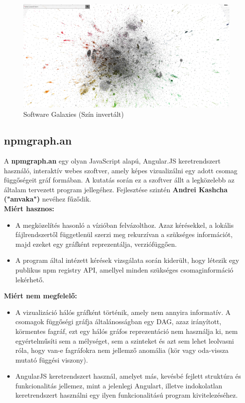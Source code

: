 	\begin{flushright}
		\cite{anvaka-galaxies}
	\end{flushright}
	
	\begin{figure}[!h]
		\centering
		\includegraphics[scale=0.1]{images/anvaka_pm.png}
		\caption{Software Galaxies (Szín invertált)}
		\label{fig:sw-galaxies}
	\end{figure}
	
	\subsection{npmgraph.an}
	
	A \textbf{npmgraph.an} egy olyan JavaScript alapú, Angular.JS keretrendszert használó, interaktív webes szoftver, amely képes vizualizálni egy adott csomag függőségeit gráf formában. A kutatás során ez a szoftver állt a legközelebb az általam tervezett program jellegéhez.	Fejlesztése szintén \textbf{Andrei Kashcha ("anvaka")} nevéhez fűződik.	\\
	
	\textbf{Miért hasznos:}
	\begin{itemize}
		\item A megközelítés hasonló a vízióban felvázolthoz. Azaz kérésekkel, a lokális fájlrendszertől függetlenül szerzi meg rekurzívan a szükséges információt, majd ezeket egy gráfként reprezentálja, verziófüggően.
		\item A program által intézett kérések vizsgálata során kiderült, hogy létezik egy publikus npm registry API, amellyel minden szükséges csomaginformáció lekérhető.
	\end{itemize}
	
	\textbf{Miért nem megfelelő:}
	\begin{itemize}
		\item A vizualizáció hálós gráfként történik, amely nem annyira informatív. A csomagok függőségi gráfja általánosságban egy DAG, azaz irányított, körmentes fagráf, ezt egy hálós gráfos reprezentáció nem használja ki, nem egyértelműsíti sem a mélységet, sem a szinteket és azt sem lehet leolvasni róla, hogy van-e fagráfokra nem jellemző anomália (kör vagy oda-vissza mutató függési viszony).
		\item AngularJS keretrendszert használ, amelyet más, kevésbé fejlett struktúra és funkcionalitás jellemez, mint a jelenlegi Angulart, illetve indokolatlan keretrendszert használni egy ilyen funkcionalitású program kivitelezéséhez.  
	\end{itemize}
	
